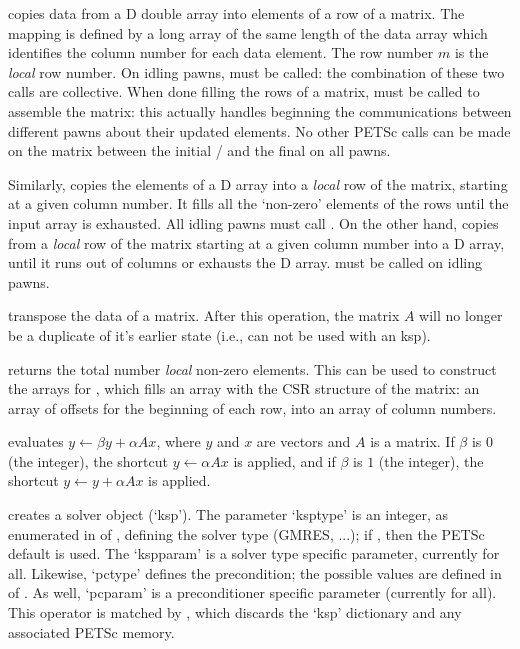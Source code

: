  copies data from a D double array into elements of
a row of a matrix. The mapping is defined by a long array of the same
length of the data array which identifies the column number for each
data element. The row number $m$ is the \emph{local} row number. On
idling pawns,  must be called: the combination
of these two calls are collective. When done filling the rows of a
matrix,  must be called to assemble the matrix:
this actually handles beginning the communications between different
pawns about their updated elements. No other PETSc calls can be made
on the matrix between the initial
/ and the final
 on all pawns.

Similarly,  copies the elements of a D array into
a \emph{local} row of the matrix, starting at a given column
number. It fills all the `non-zero' elements of the rows until the
input array is exhausted. All idling pawns must call
. On the other hand,  copies
from a \emph{local} row of the matrix starting at a given column
number into a D array, until it runs out of columns or exhausts the D
array.  must be called on idling pawns.

 transpose the data of a matrix. After this
operation, the matrix $A$ will no longer be a duplicate of it's
earlier state (i.e., can not be used with an ksp).

 returns the total number \emph{local} non-zero
elements. This can be used to construct the arrays for
, which fills an array with the CSR structure of
the matrix: an array of offsets for the beginning of each row, into an
array of column numbers.

 evaluates $y \leftarrow \beta y + \alpha Ax$,
where $y$ and $x$ are vectors and $A$ is a matrix. If $\beta$ is $0$
(the integer), the shortcut $y \leftarrow \alpha Ax$ is applied, and
if $\beta$ is $1$ (the integer), the shortcut $y \leftarrow y + \alpha
Ax$ is applied.

 creates a solver object (`ksp'). The parameter
`ksptype' is an integer, as enumerated in  of
, defining the solver type (GMRES, ...); if
, then the PETSc default is used. The `kspparam' is a
solver type specific parameter, currently  for
all. Likewise, `pctype' defines the precondition; the possible values
are defined in  of . As well,
`pcparam' is a preconditioner specific parameter (currently
 for all). This operator is matched by
, which discards the `ksp' dictionary and any
associated PETSc memory.

